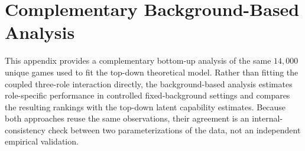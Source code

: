\documentclass[sigconf,anonymous,balance=false]{aamas}
\begin{document}
\begin{table}[t]
    \centering
    \caption{Detect-parameter MCMC diagnostics.}
    \scriptsize
    \setlength{\tabcolsep}{2.5pt}
    \label{tab:mcmc_detect}
\end{table}


\section{Complementary Background-Based Analysis}
\label{appendix:background_analysis}

This appendix provides a complementary bottom-up analysis of the same $14{,}000$ unique games used to fit the top-down theoretical model. Rather than fitting the coupled three-role interaction directly, the background-based analysis estimates role-specific performance in controlled fixed-background settings and compares the resulting rankings with the top-down latent capability estimates. Because both approaches reuse the same observations, their agreement is an internal-consistency check between two parameterizations of the data, not an independent empirical validation.
\end{document}
